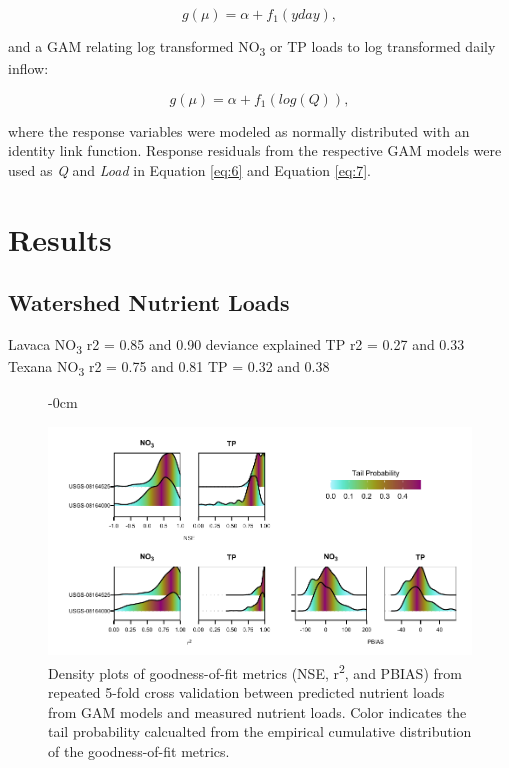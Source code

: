 \documentclass[water,article,submit,oneauthor]{Definitions/mdpi}
\begin{document}
\begin{equation}\label{eq:8}
g(\mu) = \alpha + f_1(yday),
\end{equation}

and a GAM relating log transformed NO\textsubscript{3} or TP loads to
log transformed daily inflow:

\begin{equation}\label{eq:9}
g(\mu) = \alpha + f_1(log(Q)),
\end{equation}

where the response variables were modeled as normally distributed with
an identity link function. Response residuals from the respective GAM
models were used as \emph{Q} and \emph{Load} in Equation \ref{eq:6} and
Equation \ref{eq:7}.

\hypertarget{results}{%
\section{Results}\label{results}}

\hypertarget{watershed-nutrient-loads}{%
\subsection{Watershed Nutrient Loads}\label{watershed-nutrient-loads}}

Lavaca NO\textsubscript{3} r2 = 0.85 and 0.90 deviance explained TP r2 =
0.27 and 0.33 Texana NO\textsubscript{3} r2 = 0.75 and 0.81 TP = 0.32
and 0.38

\begin{figure}[H]\begin{adjustwidth}{-\extralength}{0cm}

{\centering \includegraphics[width=1\linewidth]{Schramm-Manuscript-2023_files/figure-latex/fig2-1} 

}

\end{adjustwidth}\caption[Density plots of goodness-of-fit metrics (NSE, r\textsuperscript{2}, and PBIAS) from repeated 5-fold cross validation between predicted nutrient loads from GAM models and measured nutrient loads]{Density plots of goodness-of-fit metrics (NSE, r\textsuperscript{2}, and PBIAS) from repeated 5-fold cross validation between predicted nutrient loads from GAM models and measured nutrient loads. Color indicates the tail probability calcualted from the empirical cumulative distribution of the goodness-of-fit metrics.}\label{fig:fig2}
\end{figure}
\end{document}
